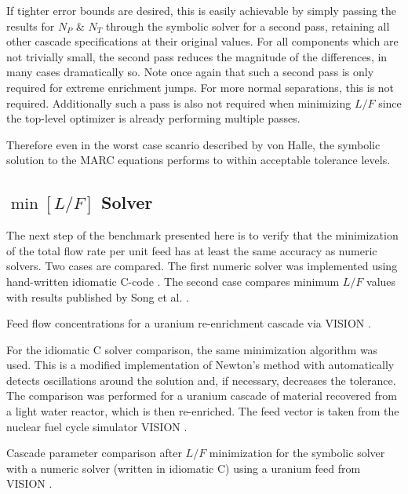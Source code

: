 \documentclass[preprint,12pt]{elsarticle}
\begin{document}
If tighter error bounds are desired, this is easily achievable by simply passing
the results for $N_P$ \& $N_T$ through the symbolic solver for a second pass, 
retaining all other cascade specifications at their original values.  For all 
components which are not trivially small, the second pass reduces the magnitude of the 
differences, in many cases dramatically so.  Note once again that such a second 
pass is only required for extreme enrichment jumps.  For more normal separations, 
this is not required.  Additionally such a pass is also not required when minimizing
$L/F$ since the top-level optimizer is already performing multiple passes.

Therefore even in the worst case scanrio described by von Halle, the symbolic 
solution to the MARC equations performs to within acceptable tolerance levels.


\subsection{$\min\left[L/F\right]$ Solver}
\label{sec:minl-solver}

The next step of the benchmark presented here is to verify that the minimization
of the total flow rate per unit feed has at least the same accuracy as 
numeric solvers.  Two cases are compared.  The first numeric solver was implemented 
using hand-written idiomatic C-code \cite{pyne:enrichment}.  The second case compares
minimum $L/F$ values with results published by Song et al. 
\cite{doi:10.1080/01496391003793884}.

\begin{table}[htbp]
\begin{center}
\caption{Feed flow concentrations for a uranium re-enrichment cascade via  
    VISION \cite{Jacobson2009}.}

\end{center}
\label{feed_vision}
\end{table}

For the idiomatic C solver comparison, the same minimization algorithm was used.  
This is a modified implementation of Newton's method with automatically detects 
oscillations around the solution and, if necessary, decreases the tolerance.
The comparison was performed for a uranium cascade of material recovered from 
a light water reactor, which is then re-enriched.  The feed vector is taken from the
nuclear fuel cycle simulator VISION \cite{Jacobson2009}.

\begin{table}[htbp]
\begin{center}
\caption{Cascade parameter comparison after $L/F$ minimization for the symbolic 
    solver with a numeric solver (written in idiomatic C) using a uranium feed from 
    VISION \cite{Jacobson2009}.}

\end{center}
\label{casc_compare_vision}
\end{table}
\end{document}

